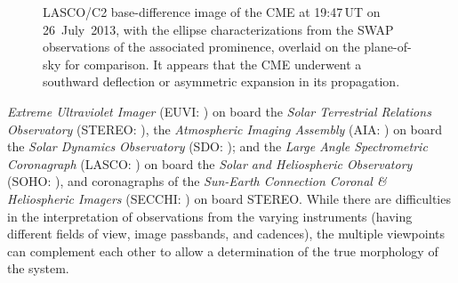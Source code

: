\documentclass[namedreferences]{solarphysics}
\begin{document}
\begin{article}
\begin{figure}[ht]
\caption{LASCO/C2 base-difference image of the CME at 19:47\,UT on 26~July~2013, with the ellipse characterizations from the SWAP observations of the associated prominence, overlaid on the plane-of-sky for comparison. It appears that the CME underwent a southward deflection or asymmetric expansion in its propagation.}
\label{swap_ells_on_lasco}
\end{figure}


 \emph{Extreme Ultraviolet Imager} (EUVI: ) on board the \emph{Solar Terrestrial Relations Observatory} (STEREO: ), the \emph{Atmospheric Imaging Assembly} (AIA: ) on board the \emph{Solar Dynamics Observatory} (SDO: ); and the  \emph{Large Angle Spectrometric Coronagraph} (LASCO: ) on board the \emph{Solar and Heliospheric Observatory} (SOHO: ), and coronagraphs of the \emph{Sun-Earth Connection Coronal \& Heliospheric Imagers} (SECCHI: \opencite{}) on board STEREO. While there are difficulties in the interpretation of observations from the varying instruments (having different fields of view, image passbands, and cadences), the multiple viewpoints can complement each other to allow a determination of the true morphology of the system. 
 

\end{article}
\end{document}
